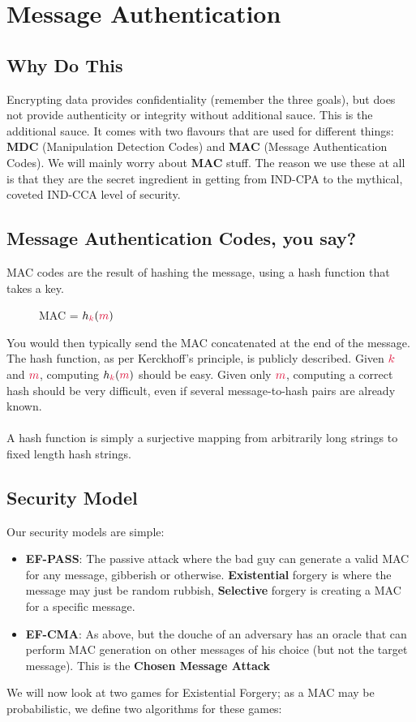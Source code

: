 \section{Message Authentication}
    \subsection{Why Do This}
        Encrypting data provides confidentiality (remember the three goals), but does not provide authenticity or integrity without additional sauce. This is the additional sauce.
        It comes with two flavours that are used for different things: \textbf{MDC} (Manipulation Detection Codes) and \textbf{MAC} (Message Authentication Codes). We will mainly worry about \textbf{MAC} stuff.
        The reason we use these at all is that they are the secret ingredient in getting from IND-CPA to the mythical, coveted IND-CCA level of security.


    \subsection{\textbf{M}essage \textbf{A}uthentication \textbf{C}odes, you say?}
    MAC codes are the result of hashing the message, using a hash function that takes a key.
    \begin{figure}[htp!]
        \centering
        MAC = $h_{\ck}(\cm)$
    \end{figure}
    You would then typically send the MAC concatenated at the end of the message. The hash function, as per Kerckhoff's principle, is publicly described. Given $\ck$ and $\cm$, computing $h_{\ck}(\cm)$ should be easy.
    Given only $\cm$, computing a correct hash should be very difficult, even if several message-to-hash pairs are already known.\\
    \\
    A hash function is simply a surjective mapping from arbitrarily long strings to fixed length hash strings.

    \subsection{Security Model}
    Our security models are simple:
    \begin{itemize}
        \item \textbf{EF-PASS}: The passive attack where the bad guy can generate a valid MAC for any message, gibberish or otherwise. 
        \textbf{Existential} forgery is where the message may just be random rubbish, \textbf{Selective} forgery is creating a MAC for a specific message.

        \item \textbf{EF-CMA}: As above, but the douche of an adversary has an oracle that can perform MAC generation on other messages of his choice (but not the target message). This is the \textbf{Chosen Message Attack}
    \end{itemize}
    We will now look at two games for Existential Forgery; as a MAC may be probabilistic, we define two algorithms for these games:


